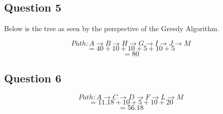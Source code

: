   \pagebreak

  \subsection{Question 5}

  Below is the tree as seen by the perspective of the Greedy Algorithm.

    $$Path: A \rightarrow B \rightarrow H \rightarrow G \rightarrow I \rightarrow J \rightarrow M $$
    $$ = 40 + 10 + 10 + 5 + 10 + 5$$
    $$ = 80 $$

  \bigskip

  \begin{flushleft}
    
  \end{flushleft}

  \pagebreak

  \subsection{Question 6}

	$$Path: A \rightarrow C \rightarrow D \rightarrow F \rightarrow L \rightarrow M$$
	$$=11.18+10+5+10+20$$
	$$=56.18$$

  \begin{flushleft}
    
  \end{flushleft}
